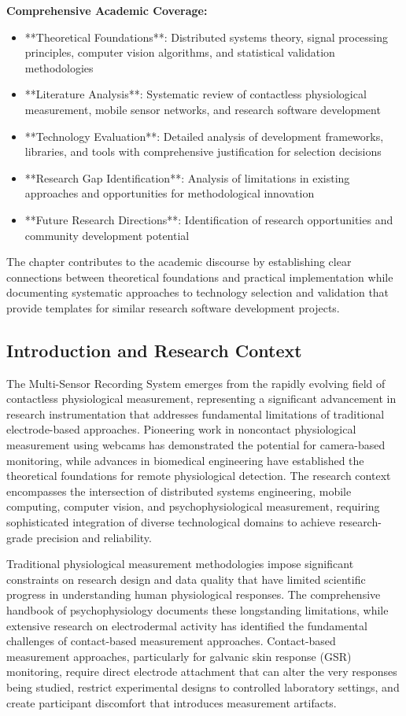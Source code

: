 \documentclass[12pt,a4paper]{article}
\begin{document}
\textbf{Comprehensive Academic Coverage:}

\begin{itemize}
\item **Theoretical Foundations**: Distributed systems theory, signal processing principles, computer vision algorithms, and
  statistical validation methodologies
\item **Literature Analysis**: Systematic review of contactless physiological measurement, mobile sensor networks, and
  research software development
\item **Technology Evaluation**: Detailed analysis of development frameworks, libraries, and tools with comprehensive
  justification for selection decisions
\item **Research Gap Identification**: Analysis of limitations in existing approaches and opportunities for methodological
  innovation
\item **Future Research Directions**: Identification of research opportunities and community development potential

\end{itemize}
The chapter contributes to the academic discourse by establishing clear connections between theoretical foundations and
practical implementation while documenting systematic approaches to technology selection and validation that provide
templates for similar research software development projects.

\subsection{Introduction and Research Context}

The Multi-Sensor Recording System emerges from the rapidly evolving field of contactless physiological measurement,
representing a significant advancement in research instrumentation that addresses fundamental limitations of traditional
electrode-based approaches. Pioneering work in noncontact physiological measurement using webcams has demonstrated the
potential for camera-based monitoring, while advances in biomedical engineering have established the theoretical
foundations for remote physiological detection. The research context encompasses the intersection of distributed systems
engineering, mobile computing, computer vision, and psychophysiological measurement, requiring sophisticated integration
of diverse technological domains to achieve research-grade precision and reliability.

Traditional physiological measurement methodologies impose significant constraints on research design and data quality
that have limited scientific progress in understanding human physiological responses. The comprehensive handbook of
psychophysiology documents these longstanding limitations, while extensive research on electrodermal activity has
identified the fundamental challenges of contact-based measurement approaches. Contact-based measurement approaches,
particularly for galvanic skin response (GSR) monitoring, require direct electrode attachment that can alter the very
responses being studied, restrict experimental designs to controlled laboratory settings, and create participant
discomfort that introduces measurement artifacts.
\end{document}
